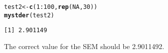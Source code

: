 \documentclass[12pt,a4paper]{article}\usepackage[]{graphicx}\usepackage[]{color}
\makeatletter
\newcommand{\hlnum}[1]{\textcolor[rgb]{0.686,0.059,0.569}{#1}}%
\newcommand{\hlopt}[1]{\textcolor[rgb]{0,0,0}{#1}}%
\newcommand{\hlstd}[1]{\textcolor[rgb]{0.345,0.345,0.345}{#1}}%
\newcommand{\hlkwb}[1]{\textcolor[rgb]{0.69,0.353,0.396}{#1}}%
\newcommand{\hlkwd}[1]{\textcolor[rgb]{0.737,0.353,0.396}{\textbf{#1}}}%
\newenvironment{kframe}{%
 \def\at@end@of@kframe{}%
 \ifinner\ifhmode%
  \def\at@end@of@kframe{\end{minipage}}%
  \begin{minipage}{\columnwidth}%
 \fi\fi%
 \def\FrameCommand##1{\hskip\@totalleftmargin \hskip-\fboxsep
 \colorbox{shadecolor}{##1}\hskip-\fboxsep
     \hskip-\linewidth \hskip-\@totalleftmargin \hskip\columnwidth}%
 \MakeFramed {\advance\hsize-\width
   \@totalleftmargin\z@ \linewidth\hsize
   \@setminipage}}%
 {\par\unskip\endMakeFramed%
 \at@end@of@kframe}
\newenvironment{knitrout}{}{} %
\makeatother
\begin{document}
\begin{enumerate}[(i)]
\begin{knitrout}
\color{fgcolor}\begin{kframe}
\begin{alltt}
\hlstd{test2} \hlkwb{<-} \hlkwd{c}\hlstd{(}\hlnum{1}\hlopt{:}\hlnum{100}\hlstd{,} \hlkwd{rep}\hlstd{(}\hlnum{NA}\hlstd{,} \hlnum{30}\hlstd{))}
\hlkwd{mystder}\hlstd{(test2)}
\end{alltt}
\begin{verbatim}
[1] 2.901149
\end{verbatim}
\end{kframe}
\end{knitrout}
The correct value for the SEM should be 2.9011492.

\end{enumerate}
\end{document}
